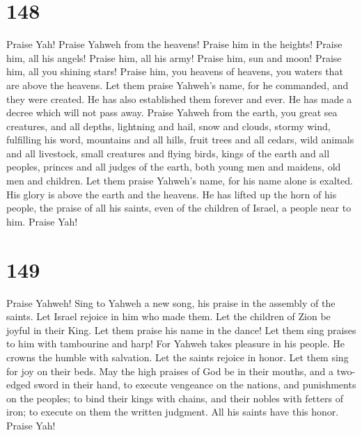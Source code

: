 \hypertarget{section-147}{%
\section{148}\label{section-147}}

 Praise Yah! Praise Yahweh from the heavens! Praise him in
the heights!  Praise him, all his angels! Praise him, all
his army!  Praise him, sun and moon! Praise him, all you
shining stars!  Praise him, you heavens of heavens, you
waters that are above the heavens.  Let them praise
Yahweh's name, for he commanded, and they were created. 
He has also established them forever and ever. He has made a decree
which will not pass away.  Praise Yahweh from the earth,
you great sea creatures, and all depths,  lightning and
hail, snow and clouds, stormy wind, fulfilling his word, 
mountains and all hills, fruit trees and all cedars, 
wild animals and all livestock, small creatures and flying birds,
 kings of the earth and all peoples, princes and all
judges of the earth,  both young men and maidens, old men
and children.  Let them praise Yahweh's name, for his
name alone is exalted. His glory is above the earth and the heavens.
 He has lifted up the horn of his people, the praise of
all his saints, even of the children of Israel, a people near to him.
Praise Yah!

\hypertarget{section-148}{%
\section{149}\label{section-148}}

 Praise Yahweh! Sing to Yahweh a new song, his praise in
the assembly of the saints.  Let Israel rejoice in him who
made them. Let the children of Zion be joyful in their King.
 Let them praise his name in the dance! Let them sing
praises to him with tambourine and harp!  For Yahweh takes
pleasure in his people. He crowns the humble with salvation.
 Let the saints rejoice in honor. Let them sing for joy on
their beds.  May the high praises of God be in their
mouths, and a two-edged sword in their hand,  to execute
vengeance on the nations, and punishments on the peoples; 
to bind their kings with chains, and their nobles with fetters of iron;
 to execute on them the written judgment. All his saints
have this honor. Praise Yah!

